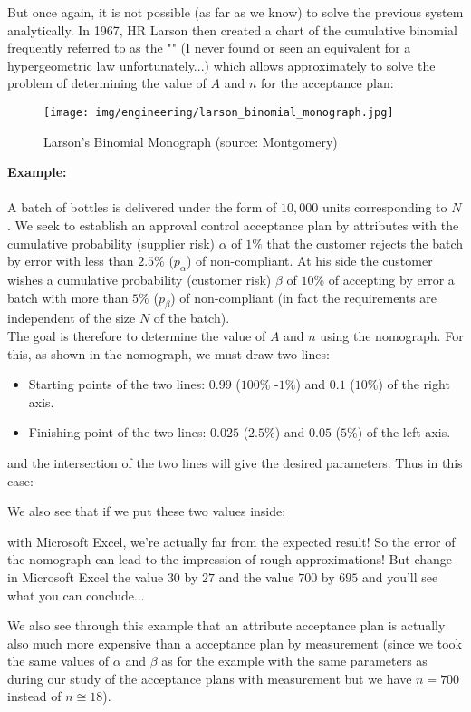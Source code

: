 	But once again, it is not possible (as far as we know) to solve the previous system analytically. In 1967, HR Larson then created a chart of the cumulative binomial frequently referred to as the "" (I never found or seen an equivalent for a hypergeometric law unfortunately...) which allows approximately to solve the problem of determining the value of $A$ and $n$ for the acceptance plan:
	\begin{figure}[H]
		\centering
		\texttt{[image: img/engineering/larson\_binomial\_monograph.jpg]}
		\caption{Larson's Binomial Monograph (source: Montgomery)}	
	\end{figure}
	\begin{tcolorbox}[colframe=black,colback=white,sharp corners]
	\textbf{{\Large {}}Example:}\\\\
	A batch of bottles is delivered under the form of $10,000$ units corresponding to $N$. We seek to establish an approval control acceptance plan by attributes with the cumulative probability (supplier risk) $\alpha$ of $1\%$ that the customer rejects the batch by error with less than $2.5\%$ ($p_\alpha$) of non-compliant. At his side the customer wishes a cumulative probability (customer risk) $\beta$ of $10\%$ of accepting by error a batch with more than $5\%$ ($p_\beta$) of non-compliant (in fact the requirements are independent of the size $N$ of the batch).\\

	The goal is therefore to determine the value of $A$ and $n$ using the nomograph. For this, as shown in the nomograph, we must draw two lines:

	\begin{itemize}
		\item Starting points of the two lines: $0.99$ ($100\%$ -$1\%$) and $0.1$ ($10\%$) of the right axis.

		\item Finishing point of the two lines: $0.025$ ($2.5\%$) and $0.05$ ($5\%$) of the left axis.
	\end{itemize}
	\end{tcolorbox}

	\begin{tcolorbox}[colframe=black,colback=white,sharp corners]
	and the intersection of the two lines will give the desired parameters. Thus in this case:
	
	We also see that if we put these two values inside:
	
	with Microsoft Excel, we're actually far from the expected result! So the error of the nomograph can lead to the impression of rough approximations! But change in Microsoft Excel  the value $30$ by $27$ and the value $700$ by $695$ and you'll see what you can conclude...
	\end{tcolorbox}
	We also see through this example that an attribute acceptance plan is actually also much more expensive than a acceptance plan by measurement (since we took the same values of $\alpha$ and $\beta$ as for the example with the same parameters as during our study of the acceptance plans with measurement but we have $n=700$ instead of $n\cong 18$).
	
